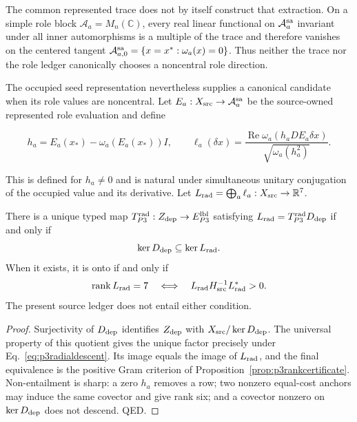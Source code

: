 The common represented trace does not by itself construct that extraction.
On a simple role block $\mathcal A_a=M_n(\mathbb C)$, every real linear
functional on $\mathcal A_a^{\rm sa}$ invariant under all inner
automorphisms is a multiple of the trace and therefore vanishes on the
centered tangent
$\mathcal A_{a,0}^{\rm sa}=\{x=x^*: \omega_a(x)=0\}$.  Thus neither the
trace nor the role ledger canonically chooses a noncentral role direction.

The occupied seed representation nevertheless supplies a canonical
candidate when its role values are noncentral.  Let
$E_a:X_{\rm src}\to\mathcal A_a^{\rm sa}$ be the source-owned represented
role evaluation and define

\begin{equation}
h_a=E_a(x_*)-\omega_a(E_a(x_*))I,
\qquad
\ell_a(\delta x)=
\frac{\operatorname{Re}\omega_a(h_aD E_a\delta x)}
 {\sqrt{\omega_a(h_a^2)}}.
\label{eq:p3radialcovector}
\end{equation}

This is defined for $h_a\ne0$ and is natural under simultaneous unitary
conjugation of the occupied value and its derivative.  Let
$L_{\rm rad}=\bigoplus_a\ell_a:X_{\rm src}\to\mathbb R^7$.

\begin{proposition}
\label{prop:p3radialextraction}
There is a unique typed map
$T_{P3}^{\rm rad}:Z_{\rm dep}\to E_{P3}^{\rm lbl}$ satisfying
$L_{\rm rad}=T_{P3}^{\rm rad}D_{\rm dep}$ if and only if
\begin{equation}
\ker D_{\rm dep}\subseteq\ker L_{\rm rad}.
\label{eq:p3radialdescent}
\end{equation}
When it exists, it is onto if and only if
\begin{equation}
\operatorname{rank}L_{\rm rad}=7
\quad\Longleftrightarrow\quad
L_{\rm rad}H_{\rm src}^{-1}L_{\rm rad}^{*}>0.
\label{eq:p3radialgram}
\end{equation}
The present source ledger does not entail either condition.
\end{proposition}

\begin{proof}
Surjectivity of $D_{\rm dep}$ identifies $Z_{\rm dep}$ with
$X_{\rm src}/\ker D_{\rm dep}$.  The universal property of this quotient
gives the unique factor precisely under
Eq.~\eqref{eq:p3radialdescent}.  Its image equals the image of
$L_{\rm rad}$, and the final equivalence is the positive Gram criterion of
Proposition~\ref{prop:p3rankcertificate}.  Non-entailment is sharp: a zero
$h_a$ removes a row; two nonzero equal-cost anchors may induce the same
covector and give rank six; and a covector nonzero on $\ker D_{\rm dep}$
does not descend.  QED.
\end{proof}


